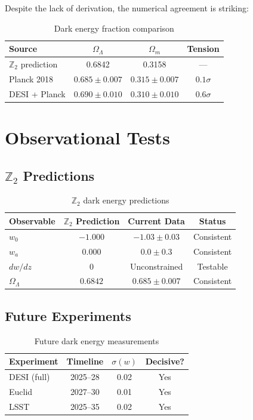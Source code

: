 \documentclass[12pt,a4paper]{article}
\begin{document}
Despite the lack of derivation, the numerical agreement is striking:

\begin{table}[h]
\centering
\begin{tabular}{lccc}
\toprule
Source & $\Omega_\Lambda$ & $\Omega_m$ & Tension \\
\midrule
$\mathbb{Z}_2$ prediction & 0.6842 & 0.3158 & --- \\
Planck 2018 & $0.685 \pm 0.007$ & $0.315 \pm 0.007$ & $0.1\sigma$ \\
DESI + Planck & $0.690 \pm 0.010$ & $0.310 \pm 0.010$ & $0.6\sigma$ \\
\bottomrule
\end{tabular}
\caption{Dark energy fraction comparison}
\end{table}

\section{Observational Tests}

\subsection{$\mathbb{Z}_2$ Predictions}

\begin{table}[h]
\centering
\begin{tabular}{lccc}
\toprule
Observable & $\mathbb{Z}_2$ Prediction & Current Data & Status \\
\midrule
$w_0$ & $-1.000$ & $-1.03 \pm 0.03$ & Consistent \\
$w_a$ & $0.000$ & $0.0 \pm 0.3$ & Consistent \\
$dw/dz$ & $0$ & Unconstrained & Testable \\
$\Omega_\Lambda$ & $0.6842$ & $0.685 \pm 0.007$ & Consistent \\
\bottomrule
\end{tabular}
\caption{$\mathbb{Z}_2$ dark energy predictions}
\end{table}

\subsection{Future Experiments}

\begin{table}[h]
\centering
\begin{tabular}{lccc}
\toprule
Experiment & Timeline & $\sigma(w)$ & Decisive? \\
\midrule
DESI (full) & 2025--28 & 0.02 & Yes \\
Euclid & 2027--30 & 0.01 & Yes \\
LSST & 2025--35 & 0.02 & Yes \\
\bottomrule
\end{tabular}
\caption{Future dark energy measurements}
\end{table}
\end{document}

